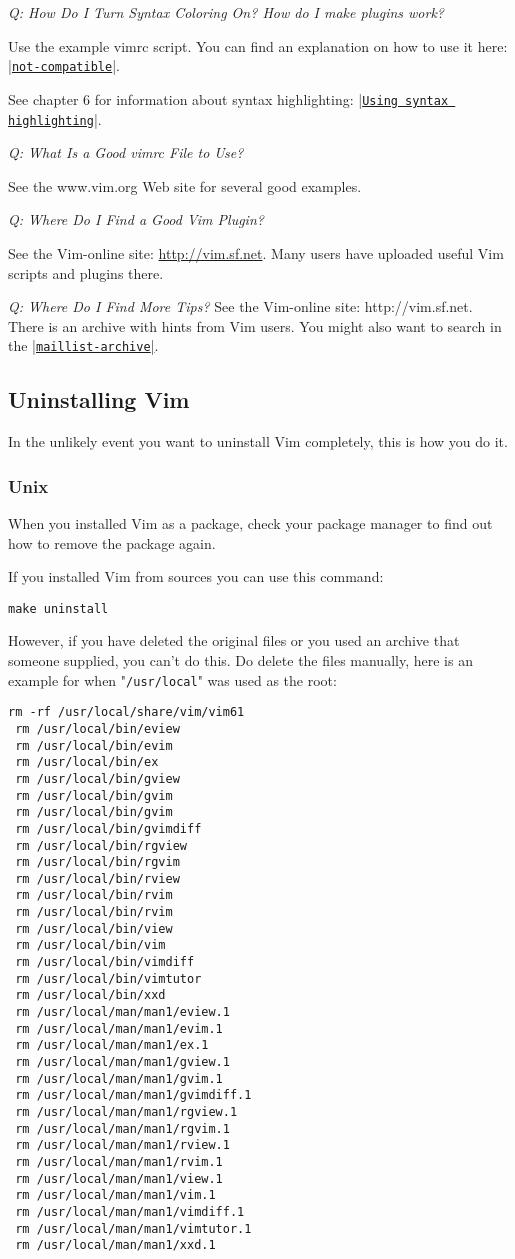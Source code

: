 \textit{Q: How Do I Turn Syntax Coloring On?  How do I make plugins work?}

Use the example vimrc script.
You can find an explanation on how to use it here: \hyperref[not-compatible]{|\texttt{not-compatible}|}.

See chapter 6 for information about syntax highlighting: |\hyperref[Using syntax highlighting]{\texttt{Using syntax highlighting}}|.

\textit{Q: What Is a Good vimrc File to Use?}

See the www.vim.org Web site for several good examples.

\textit{Q: Where Do I Find a Good Vim Plugin?}

See the Vim-online site: \url{http://vim.sf.net}.
Many users have uploaded useful Vim scripts and plugins there.

\textit{Q: Where Do I Find More Tips?}
See the Vim-online site:   http://vim.sf.net. There is an archive with hints from Vim users.
You might also want to search in the \hyperref[maillist-archive]{|\texttt{maillist-archive}|}.
\subsection{Uninstalling Vim}
\label{Uninstalling Vim}
In the unlikely event you want to uninstall Vim completely, this is how you do it.
\subsubsection{Unix}
When you installed Vim as a package, check your package manager to find out how to remove the package again.

If you installed Vim from sources you can use this command:

\begin{Verbatim}[samepage=true]
 make uninstall
\end{Verbatim}

However, if you have deleted the original files or you used an archive that someone supplied, you can't do this.
Do delete the files manually, here is an example for when "\texttt{/usr/local}" was used as the root:

\begin{Verbatim}[samepage=true]
 rm -rf /usr/local/share/vim/vim61
 rm /usr/local/bin/eview
 rm /usr/local/bin/evim
 rm /usr/local/bin/ex
 rm /usr/local/bin/gview
 rm /usr/local/bin/gvim
 rm /usr/local/bin/gvim
 rm /usr/local/bin/gvimdiff
 rm /usr/local/bin/rgview
 rm /usr/local/bin/rgvim
 rm /usr/local/bin/rview
 rm /usr/local/bin/rvim
 rm /usr/local/bin/rvim
 rm /usr/local/bin/view
 rm /usr/local/bin/vim
 rm /usr/local/bin/vimdiff
 rm /usr/local/bin/vimtutor
 rm /usr/local/bin/xxd
 rm /usr/local/man/man1/eview.1
 rm /usr/local/man/man1/evim.1
 rm /usr/local/man/man1/ex.1
 rm /usr/local/man/man1/gview.1
 rm /usr/local/man/man1/gvim.1
 rm /usr/local/man/man1/gvimdiff.1
 rm /usr/local/man/man1/rgview.1
 rm /usr/local/man/man1/rgvim.1
 rm /usr/local/man/man1/rview.1
 rm /usr/local/man/man1/rvim.1
 rm /usr/local/man/man1/view.1
 rm /usr/local/man/man1/vim.1
 rm /usr/local/man/man1/vimdiff.1
 rm /usr/local/man/man1/vimtutor.1
 rm /usr/local/man/man1/xxd.1
\end{Verbatim}

